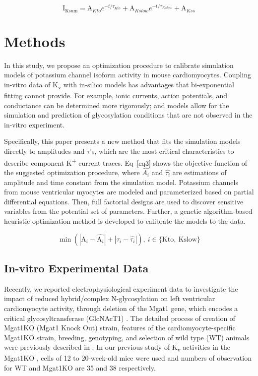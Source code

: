 \documentclass[10pt,letterpaper]{article}
\begin{document}
\begin{equation}
    \mathrm{I}_{\mathrm{Ksum}} = \mathrm{A}_{Kto} e^{-t/\tau_{Kto}} + \mathrm{A}_{Kslow} e^{-t/\tau_{Kslow}} + \mathrm{A}_{Kss}
    \label{eq2}
\end{equation}

\section*{Methods}
In this study, we propose an optimization procedure to calibrate simulation models of potassium channel isoform activity in mouse cardiomyocytes. Coupling in-vitro data of K\textsubscript{v} with in-silico models has advantages that bi-exponential fitting cannot provide. For example, ionic currents, action potentials, and conductance can be determined more rigorously; and models allow for the simulation and prediction of glycosylation conditions that are not observed in the in-vitro experiment. 

Specifically, this paper presents a new method that fits the simulation models directly to amplitudes and $\tau$'s, which are the most critical characteristics to describe component K\textsuperscript{+} current traces. Eq~\ref{eq3} shows the objective function of the suggested optimization procedure, where $\hat{A_i}$ and $\hat{\tau_i}$ are estimations of amplitude and time constant from the simulation model. Potassium channels from mouse ventricular myocytes are modeled and parameterized based on partial differential equations. Then, full factorial designs are used to discover sensitive variables from the potential set of parameters. Further, a genetic algorithm-based heuristic optimization method is developed to calibrate the models to the data.

\begin{equation}
    \min (|\mathrm{A}_i - \hat{\mathrm{A}_i}| + |\tau_i - \hat{\tau_i}|), \ i \in \{\mathrm{Kto},\ \mathrm{Kslow}\}
    \label{eq3}
\end{equation}

\subsection*{In-vitro Experimental Data}
Recently, we reported electrophysiological experiment data to investigate the impact of reduced hybrid/complex N-glycosylation on left ventricular cardiomyocyte activity, through deletion of the Mgat1 gene, which encodes a critical glycosyltransferase (GlcNAcT1) \cite{ednie2019reduced, ednie2019reduced2}. The detailed process of creation of Mgat1KO (Mgat1 Knock Out) strain, features of the cardiomyocyte-specific Mgat1KO strain, breeding, genotyping, and selection of wild type (WT) animals were previously described in \cite{ednie2019reduced2}. In our previous study of K\textsubscript{v} activities in the Mgat1KO \cite{ednie2019reduced}, cells of 12 to 20-week-old mice were used and numbers of observation for WT and Mgat1KO are 35 and 38 respectively.
\end{document}
